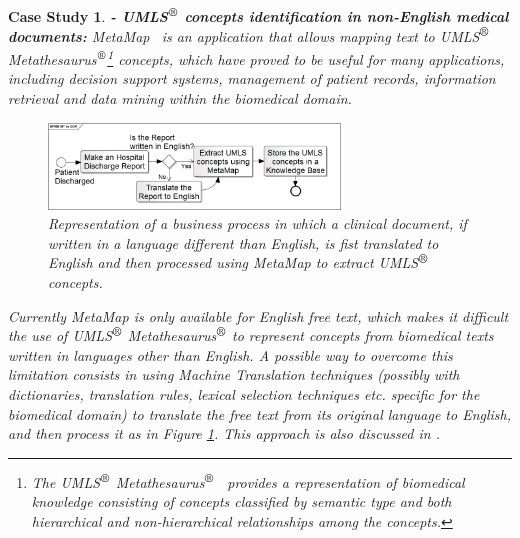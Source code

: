 \documentclass[11pt]{article}
\newtheorem{cs}{Case Study}
\begin{document}
\begin{cs}{\bf - UMLS$^{\mbox{\small\textregistered}}$ concepts identification in non-English medical documents:}
MetaMap~\citep{metamap} is an application that allows mapping text to UMLS$^{\mbox{\small\textregistered}}$ Metathesaurus$^{\mbox{\small\textregistered}}$\footnote{The UMLS$^{\mbox{\small\textregistered}}$ Metathesaurus$^{\mbox{\small\textregistered}}$~\citep{umls} provides a representation of biomedical knowledge consisting of concepts classified by semantic type and both hierarchical and non-hierarchical relationships among the concepts.} concepts, which have proved to be useful for many applications, including decision support systems, management of patient records, information retrieval and data mining within the biomedical domain.

\begin{figure}[!ht]
\begin{center}
\includegraphics[width=7.75cm]{mtsoa}
\end{center}
\caption{Representation of a business process in which a clinical document, if written in a language different than English, is fist translated to English and then processed using MetaMap to extract UMLS$^{\mbox{\small\textregistered}}$ concepts.}
\label{fig:mtsoa}
\end{figure}

Currently MetaMap is only available for English free text, which makes it difficult the use of UMLS$^{\mbox{\small\textregistered}}$ Metathesaurus$^{\mbox{\small\textregistered}}$ to represent concepts from biomedical texts written in languages other than English. A possible way to overcome this limitation consists in using Machine Translation techniques (possibly with dictionaries, translation rules, lexical selection techniques etc. specific for the biomedical domain) to translate the free text from its original language to English, and then process it as in Figure \ref{fig:mtsoa}. This approach is also discussed in .
\end{cs}
\end{document}
